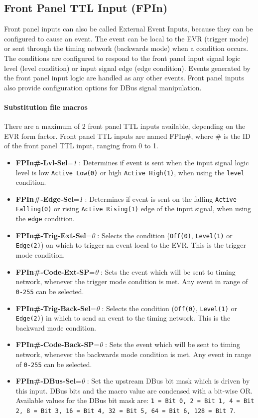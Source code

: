\documentclass[12pt,a4paper]{article}
\begin{document}
\subsection{Front Panel TTL Input (FPIn)}\label{sec:Front Panel TTL Input}
Front panel inputs can also be called External Event Inputs, because they can be configured to cause an event. The event can be local to the EVR (trigger mode) or sent through the timing network (backwards mode) when a condition occurs. The conditions are configured to respond to the front panel input signal logic level (level condition) or input signal edge (edge condition). Events generated by the front panel input logic are handled as any other events. Front panel inputs also provide configuration options for DBus signal manipulation.

\paragraph{Substitution file macros}
There are a maximum of 2 front panel TTL inputs available, depending on the EVR form factor. Front panel TTL inputs are named FPIn\#, where \# is the ID of the front panel TTL input, ranging from 0 to 1.
\begin{itemize}
  \item
    \textbf{FPIn\#-Lvl-Sel}=\emph{1} : Determines if event is sent when the input signal logic level is low \texttt{Active Low(0)} or high \texttt{Active High(1)}, when using the \texttt{level} condition.
  \item
    \textbf{FPIn\#-Edge-Sel}=\emph{1} : Determines if event is sent on the falling \texttt{Active Falling(0)} or rising \texttt{Active Rising(1)} edge of the input signal, when using the \texttt{edge} condition.
  \item
    \textbf{FPIn\#-Trig-Ext-Sel}=\emph{0} : Selects the condition (\texttt{Off(0)}, \texttt{Level(1)} or \texttt{Edge(2)}) on which to trigger an event local to the EVR. This is the trigger mode condition.
  \item
    \textbf{FPIn\#-Code-Ext-SP}=\emph{0} : Sets the event which will be sent to timing network, whenever the trigger mode condition is met. Any event in range of \texttt{0-255} can be selected.
  \item
    \textbf{FPIn\#-Trig-Back-Sel}=\emph{0} : Selects the condition (\texttt{Off(0)}, \texttt{Level(1)} or \texttt{Edge(2)}) in which to send an event to the timing network. This is the backward mode condition.
  \item
    \textbf{FPIn\#-Code-Back-SP}=\emph{0} : Sets the event which will be sent to timing network, whenever the backwards mode condition is met. Any event in range of \texttt{0-255} can be selected.
  \item
    \textbf{FPIn\#-DBus-Sel}=\emph{0} : Set the upstream DBus bit mask which is driven by this input. DBus bits and the macro value are condensed with a bit-wise OR. Available values for the DBus bit mask are: \texttt{1 = Bit 0, 2 = Bit 1, 4 = Bit 2, 8 = Bit 3, 16 = Bit 4, 32 = Bit 5, 64 = Bit 6, 128 = Bit 7}.
  \end{itemize}
  
\end{document}
